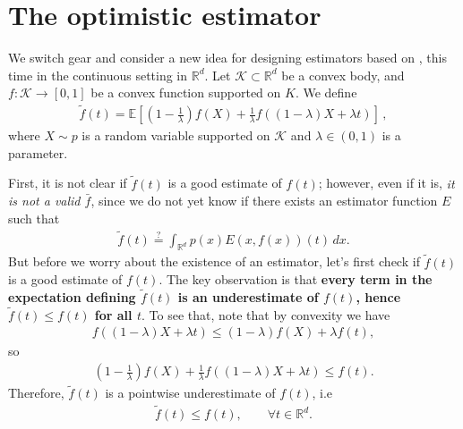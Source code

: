 \documentclass{article}
\theoremstyle{plain}
\theoremstyle{definition}
\theoremstyle{plain}
\newcommand{\R}{\mathbb R}
\newcommand{\Rd}{\mathbb{R}^d}
\newcommand{\E}{\mathbb E}
\newcommand{\K}{\mathcal K}
\begin{document}
\section{The optimistic estimator}
We switch gear and consider a new idea for designing estimators based on \cite{bubeck2016kernelbasedmethodsbanditconvex}, this time in the continuous setting
in $\R^d$.
Let $\K \subset \Rd$ be a convex body, and $f: \K \to [0,1]$ be a convex function supported on $K$.
We define
\begin{align}
    \tilde{f}(t) = \E\left[
        \left(1 - \frac{1}{\lambda}\right) f(X)
        + \frac{1}{\lambda} f\left(
        (1-\lambda) X + \lambda t
        \right)
        \right]\,,
\end{align}
where $X \sim p$ is a random variable supported on $\K$ and $\lambda\in(0,1)$ is a parameter.

First, it is not clear if $\tilde{f}(t)$ is a good estimate of $f(t)$;
however, even if it is, \textit{it is not a valid $\bar{f}$},
since we do not yet know if there exists an estimator function $E$ such that
\begin{align}
    \tilde{f}(t) \stackrel{?}{=} \int_{\Rd} p(x) E(x,f(x))(t)\,dx.
\end{align}
But before we worry about the existence of an estimator, let's first check if $\tilde{f}(t)$ is a good estimate of $f(t)$.
The key observation is that \textbf{every term in the expectation defining $\tilde{f}(t)$ is an underestimate of $f(t)$, hence $\tilde{f}(t)\le f(t)$ for all $t$}.
To see that, note that by convexity we have
\begin{align}
    f\left((1-\lambda)X+\lambda t\right)
    \le (1-\lambda)f(X) + \lambda f(t),
\end{align}so
\begin{align}
    \left(1 - \frac{1}{\lambda}\right) f(X)
    + \frac{1}{\lambda} f\left((1-\lambda) X + \lambda t\right)
    \le f(t).
\end{align}
Therefore, $\tilde{f}(t)$ is a pointwise underestimate of $f(t)$, i.e
\begin{align}
    \label{eq:tilde_f_underestimates_f}
    \tilde{f}(t) \le f(t),\qquad \forall t\in \Rd.
\end{align}
\end{document}
